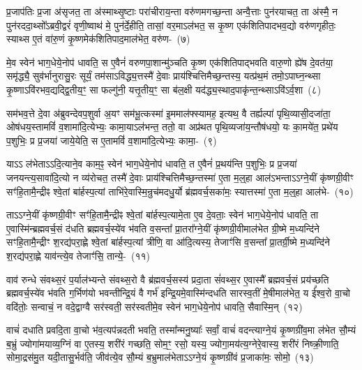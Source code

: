 प्र॒जा\-प॑तिः प्र॒जा अ॑सृजत॒ ता अ॑स्माथ्सृ॒ष्टाः परा॑चीराय॒न्ता वरु॑णमगच्छ॒न्ता अन्वै॒त्ताः पुन॑रयाचत॒ ता अ॑स्मै॒ न पुन॑रददा॒थ्सो᳚\-ऽब्रवी॒द्वरं॑ वृणी॒ष्वाथ॑ मे॒ पुन॑र्दे॒हीति॒ तासां॒ वर॒मा\-ऽल॑भत॒ स कृ॒ष्ण एक॑शितिपादभव॒द्यो वरु॑णगृहीतः॒ स्याथ्स ए॒तं वा॑रु॒णं कृ॒ष्णमेक॑शितिपाद॒मा\-ल॑भेत॒ वरु॑ण-~(७)

मे॒व स्वेन॑ भाग॒धेये॒नोप॑ धावति॒ स ए॒वैनं॑ वरुणपा॒शान्मु॑ञ्चति कृ॒ष्ण एक॑शितिपाद्भवति वारु॒णो ह्ये॑ष दे॒वत॑या॒ समृ॑द्ध्यै॒ सुव॑र्भानुरासु॒रः सूर्यं॒ तम॑सा\-ऽविद्ध्य॒त्तस्मै॑ दे॒वाः प्राय॑श्चित्तिमैच्छ॒न्तस्य॒ यत्प्र॑थ॒मं तमो॒\-ऽपाघ्न॒न्थ्सा कृ॒ष्णा\-ऽवि॑रभव॒द्यद्द्वि॒तीय॒ꣳ॒ सा फल्गु॑नी॒ यत्तृ॒तीय॒ꣳ॒ सा ब॑ल॒क्षी यद॑द्ध्य॒स्थाद॒पाकृ॑न्त॒न्थ्सा\-ऽवि॑\-ऽर्व॒शा~(८)

सम॑भव॒त्ते दे॒वा अ॑ब्रुवन्देवप॒शुर्वा अ॒यꣳ सम॑भू॒त्कस्मा॑ इ॒ममाल॑फ्स्यामह॒ इत्यथ॒ वै तर्ह्यल्पा॑ पृथि॒व्यासी॒दजा॑ता॒ ओष॑धय॒स्तामविं॑ व॒शामा॑दि॒त्येभ्यः॒ कामा॒या\-ऽल॑भन्त॒ ततो॒ वा अप्र॑थत पृथि॒व्यजा॑य॒न्तौष॑धयो॒ यः का॒मये॑त॒ प्रथे॑य प॒शुभिः॒ प्र प्र॒जया॑ जाये॒येति॒ स ए॒तामविं॑ व॒शामा॑दि॒त्येभ्यः॒ कामा॒-~(९)

या\-ऽऽ\- ल॑भेता\-ऽऽ\-दि॒त्याने॒व काम॒ꣴ॒ स्वेन॑ भाग॒धेये॒नोप॑ धावति॒ त ए॒वैनं॑ प्र॒थय॑न्ति प॒शुभिः॒ प्र प्र॒जया॑ जनयन्त्य॒सावा॑दि॒त्यो न व्य॑रोचत॒ तस्मै॑ दे॒वाः प्राय॑श्चित्तिमैच्छ॒न्तस्मा॑ ए॒ता म॒ल्॒\mbox{}हा आल॑\-ऽभन्ता\-ऽऽ\-ग्ने॒यीं कृ॑ष्णग्री॒वीꣳ सꣳ॑हि॒तामै॒न्द्रीꣴ श्वे॒तां बा॑र्\mbox{}हस्प॒त्यां ताभि॑रे॒वास्मि॒न्रुच॑मदधु॒र्यो ब्र॑ह्मवर्च॒सका॑मः॒ स्यात्तस्मा॑ ए॒ता म॒ल्॒\mbox{}हा आल॑भे-~(१०)

ता\-ऽऽ\-ग्ने॒यीं कृ॑ष्णग्री॒वीꣳ सꣳ॑हि॒तामै॒न्द्रीꣴ श्वे॒तां बा॑र्\mbox{}हस्प॒त्या\-मे॒ता ए॒व दे॒वताः॒ स्वेन॑ भाग॒धेये॒नोप॑ धावति॒ ता ए॒वास्मि॑न्ब्रह्मवर्च॒सं द॑धति ब्रह्मवर्च॒स्ये॑व भ॑वति व॒सन्ता᳚ प्रा॒तरा᳚ग्ने॒यीं कृ॑ष्णग्री॒वीमाल॑भेत ग्री॒ष्मे म॒ध्यन्दि॑ने सꣳहि॒तामै॒न्द्रीꣳ श॒रद्य॑परा॒ह्णे श्वे॒तां बा॑र्\mbox{}हस्प॒त्यां त्रीणि॒ वा आ॑दि॒त्यस्य॒ तेजाꣳ॑सि व॒सन्ता᳚ प्रा॒तर्ग्री॒ष्मे म॒ध्यन्दि॑ने श॒रद्य॑परा॒ह्णे याव॑न्त्ये॒व तेजाꣳ॑सि॒ तान्ये॒-~(११)

वाव॑ रुन्धे संवथ्स॒रं प॒र्याल॑भ्यन्ते संवथ्स॒रो वै ब्र॑ह्मवर्च॒सस्य॑ प्रदा॒ता सं॑वथ्स॒र ए॒वास्मै᳚ ब्रह्मवर्च॒सं प्रय॑च्छति ब्रह्मवर्च॒स्ये॑व भ॑वति ग॒र्भिण॑यो भवन्तीन्द्रि॒यं वै गर्भ॑ इन्द्रि॒यमे॒वास्मि॑न्दधति सारस्व॒तीं मे॒षीमा\-ल॑भेत॒ य ई᳚श्व॒रो वा॒चो वदि॑तोः॒ सन्वाचं॒ न वदे॒द्वाग्वै सर॑स्वती॒ सर॑स्वतीमे॒व स्वेन॑ भाग॒धेये॒नोप॑ धावति॒ सैवास्मि॒न्~(१२)

वाचं॑ दधाति प्रवदि॒ता वा॒चो भ॑व॒त्यप॑न्नदती भवति॒ तस्मा᳚न्मनु॒ष्याः᳚ सर्वां॒ वाचं॑ वदन्त्याग्ने॒यं कृ॒ष्णग्री॑व॒मा ल॑भेत सौ॒म्यं ब॒भ्रुं ज्योगा॑मयाव्य॒ग्निं वा ए॒तस्य॒ शरी॑रं गच्छति॒ सोम॒ꣳ॒ रसो॒ यस्य॒ ज्योगा॒मय॑त्य॒ग्नेरे॒वास्य॒ शरी॑रं निष्क्री॒णाति॒ सोमा॒द्रस॑मु॒त यदी॒तासु॒र्भव॑ति॒ जीव॑त्ये॒व सौ॒म्यं ब॒भ्रुमा\-ल॑भेता\-ऽऽ\-ग्ने॒यं कृ॒ष्णग्री॑वं प्र॒जाका॑मः॒ सोमो॒~(१३)

